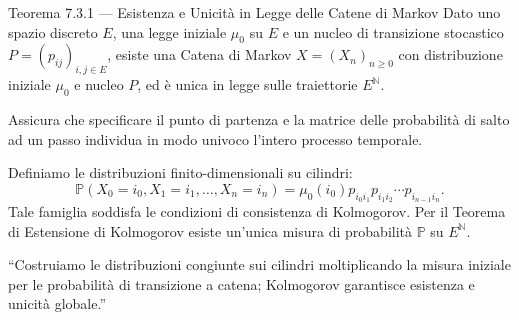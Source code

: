 \documentclass[11pt,a4paper]{report}
\begin{document}
\begin{teoremabox}{Teorema 7.3.1 --- Esistenza e Unicità in Legge delle Catene di Markov}
Dato uno spazio discreto $E$, una legge iniziale $\mu_0$ su $E$ e un nucleo di transizione stocastico $P = (p_{ij})_{i,j \in E}$, esiste una Catena di Markov $X = (X_n)_{n \ge 0}$ con distribuzione iniziale $\mu_0$ e nucleo $P$, ed è unica in legge sulle traiettorie $E^{\mathbb{N}}$.

\begin{cosafa}
Assicura che specificare il punto di partenza e la matrice delle probabilità di salto ad un passo individua in modo univoco l'intero processo temporale.
\end{cosafa}

\begin{dimostrazione}
Definiamo le distribuzioni finito-dimensionali su cilindri:
\[
\mathbb{P}(X_0 = i_0, X_1 = i_1, \dots, X_n = i_n) = \mu_0(i_0) p_{i_0 i_1} p_{i_1 i_2} \cdots p_{i_{n-1} i_n}.
\]
Tale famiglia soddisfa le condizioni di consistenza di Kolmogorov. Per il Teorema di Estensione di Kolmogorov esiste un'unica misura di probabilità $\mathbb{P}$ su $E^{\mathbb{N}}$.
\end{dimostrazione}

\begin{oralbox}
``Costruiamo le distribuzioni congiunte sui cilindri moltiplicando la misura iniziale per le probabilità di transizione a catena; Kolmogorov garantisce esistenza e unicità globale.''
\end{oralbox}
\end{teoremabox}

\vspace{0.3cm}
\end{document}
